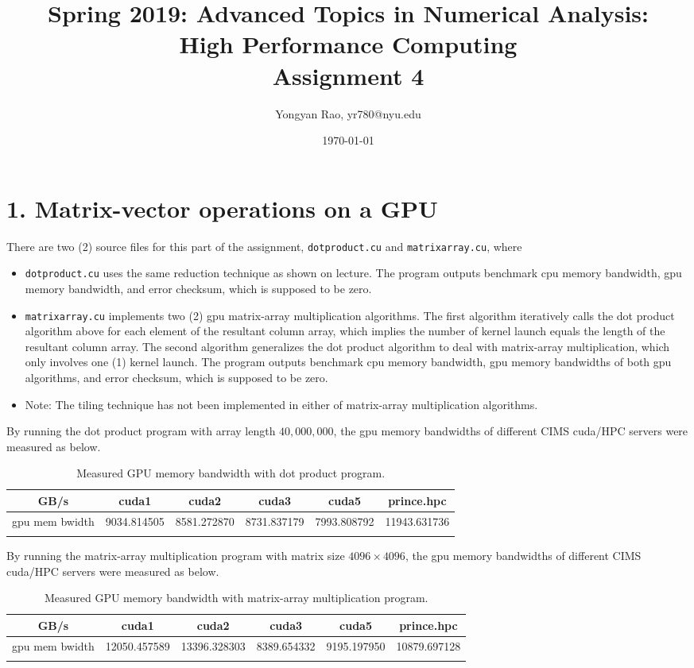 \documentclass[amsmath,amssymb]{revtex4}
\begin{document}
\title{Spring 2019: Advanced Topics in Numerical Analysis:\\
High Performance Computing\\
Assignment 4}
\author{Yongyan Rao, yr780@nyu.edu}
\date{\today}
\maketitle


\section{\label{sec:sec1}1. Matrix-vector operations on a GPU}
There are two (2) source files for this part of the assignment, {\tt dotproduct.cu} and {\tt matrixarray.cu}, where
\begin{itemize}
\item {\tt dotproduct.cu} uses the same reduction technique as shown on lecture. The program outputs benchmark cpu memory bandwidth, gpu memory bandwidth, and error checksum, which is supposed to be zero.
\item {\tt matrixarray.cu} implements two (2) gpu matrix-array multiplication algorithms. The first algorithm iteratively calls the dot product algorithm above for each element of the resultant column array, which implies the number of kernel launch equals the length of the resultant column array. The second algorithm generalizes the dot product algorithm to deal with matrix-array multiplication, which only involves one (1) kernel launch. The program outputs benchmark cpu memory bandwidth, gpu memory bandwidths of both gpu algorithms, and error checksum, which is supposed to be zero.
\item Note: The tiling technique has not been implemented in either of matrix-array multiplication algorithms.
\end{itemize}
By running the dot product program with array length $40,000,000$, the gpu memory bandwidths of different CIMS cuda/HPC servers were measured as below.
\begin{longtable}{c | c | c | c | c | c }
    \hline 
GB/s & cuda1 & cuda2 & cuda3 & cuda5 & prince.hpc \\ \hline \hline
gpu mem bwidth&9034.814505	&8581.272870  &	8731.837179 & 7993.808792 & 11943.631736 \\\hline
\caption{Measured GPU memory bandwidth with dot product program.}
\end{longtable}
By running the matrix-array multiplication program with matrix size $4096\times4096$, the gpu memory bandwidths of different CIMS cuda/HPC servers were measured as below.
\begin{longtable}{c | c | c | c | c | c }
    \hline 
GB/s & cuda1 & cuda2 & cuda3 & cuda5 & prince.hpc \\ \hline \hline
gpu mem bwidth&12050.457589&13396.328303  &	8389.654332 & 9195.197950  & 10879.697128 \\\hline
\caption{Measured GPU memory bandwidth with matrix-array multiplication program.}
\end{longtable}
\end{document}
